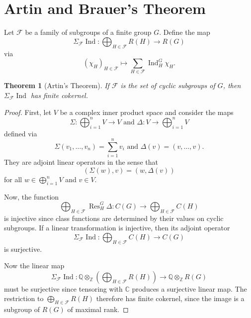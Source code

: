 \documentclass[12pt]{article}
\theoremstyle{plain}
\newtheorem{theorem}{Theorem}[section]
\theoremstyle{definition}
\theoremstyle{remark}
\numberwithin{equation}{section}
\begin{document}
\section{Artin and Brauer's Theorem}

Let $\mathcal{F}$ be a family of subgroups of a finite group $G$.
Define the map
\[
\Sigma_{\mathcal{F}} \operatorname{Ind} :
\bigoplus_{H \in \mathcal{F}} R(H) \to R(G)
\]
via
\[
(\chi_H)_{H \in \mathcal{F}} \mapsto \sum_{H \in \mathcal{F}}
\operatorname{Ind}_H^G \chi_H .
\]

\begin{theorem}[Artin's Theorem]
If $\mathcal{F}$ is the set of cyclic subgroups of $G$,
then $\Sigma_{\mathcal{F}} \operatorname{Ind}$ has finite cokernel.
\end{theorem}

\begin{proof}
First, let $V$ be a complex inner product space and consider the maps
\[
\Sigma : \bigoplus_{i=1}^n V \to V \textrm{ and }
\Delta : V \to \bigoplus_{i=1}^n V
\]
defined via
\[
\Sigma\left(v_1,\ldots,v_n\right) = \sum_{i=1}^n v_i \textrm{ and }
\Delta(v) = (v,\ldots,v).
\]
They are adjoint linear operators in the sense that
\[
\left( \Sigma(w), v \right) = \left( w, \Delta(v) \right)
\]
for all $w \in \bigoplus_{i=1}^n V$ and $v \in V$.

Now, the function
\[
\bigoplus_{H \in \mathcal{F}} \operatorname{Res}^G_H \Delta:
C(G) \to \bigoplus_{H \in \mathcal{F}} C(H)
\]
is injective since class functions are determined by their values on
cyclic subgroups.
If a linear transformation is injective, then its adjoint operator
\[
\Sigma_{\mathcal{F}} \operatorname{Ind} :
\bigoplus_{H \in \mathcal{F}} C(H) \to C(G)
\]
is surjective.

Now the linear map
\[
\Sigma_{\mathcal{F}} \operatorname{Ind} :
\mathbb{Q} \otimes_{\mathbb{Z}}
\left(\bigoplus_{H \in \mathcal{F}} R(H)\right)
\to \mathbb{Q} \otimes_{\mathbb{Z}} R(G)
\]
must be surjective since tensoring with $\mathbb{C}$ produces a
surjective linear map.
The restriction to $\bigoplus_{H \in \mathcal{F}} R(H)$
therefore has finite cokernel, since the image is a subgroup of $R(G)$
of maximal rank.
\end{proof}



\end{document}
